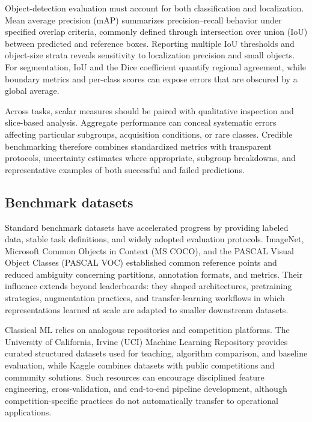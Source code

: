 \documentclass{article}
\begin{document}
Object-detection evaluation must account for both classification and localization. Mean average precision (mAP) summarizes precision--recall behavior under specified overlap criteria, commonly defined through intersection over union (IoU) between predicted and reference boxes. Reporting multiple IoU thresholds and object-size strata reveals sensitivity to localization precision and small objects. For segmentation, IoU and the Dice coefficient quantify regional agreement, while boundary metrics and per-class scores can expose errors that are obscured by a global average.

Across tasks, scalar measures should be paired with qualitative inspection and slice-based analysis. Aggregate performance can conceal systematic errors affecting particular subgroups, acquisition conditions, or rare classes. Credible benchmarking therefore combines standardized metrics with transparent protocols, uncertainty estimates where appropriate, subgroup breakdowns, and representative examples of both successful and failed predictions.


\subsection{Benchmark datasets}

Standard benchmark datasets have accelerated progress by providing labeled data, stable task definitions, and widely adopted evaluation protocols. ImageNet, Microsoft Common Objects in Context (MS COCO), and the PASCAL Visual Object Classes (PASCAL VOC) established common reference points and reduced ambiguity concerning partitions, annotation formats, and metrics. Their influence extends beyond leaderboards: they shaped architectures, pretraining strategies, augmentation practices, and transfer-learning workflows in which representations learned at scale are adapted to smaller downstream datasets.

Classical ML relies on analogous repositories and competition platforms. The University of California, Irvine (UCI) Machine Learning Repository provides curated structured datasets used for teaching, algorithm comparison, and baseline evaluation, while Kaggle combines datasets with public competitions and community solutions. Such resources can encourage disciplined feature engineering, cross-validation, and end-to-end pipeline development, although competition-specific practices do not automatically transfer to operational applications.
\end{document}

